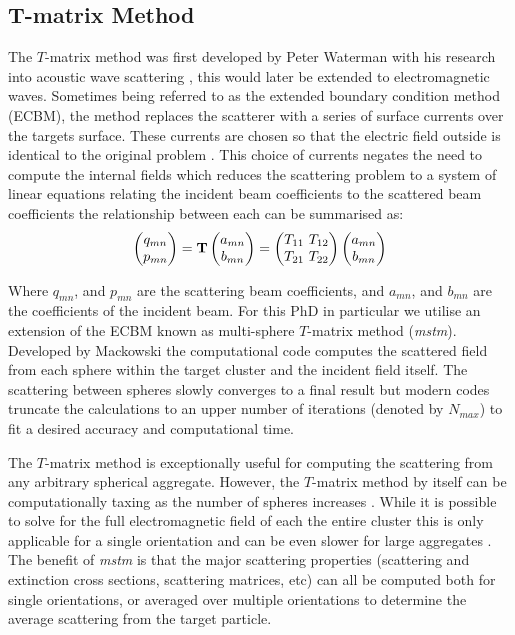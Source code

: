 \subsection{T-matrix Method}
The $T$-matrix method was first developed by Peter Waterman with his
research into acoustic wave scattering \cite{Waterman1969}, this 
would later be extended to electromagnetic waves. Sometimes being 
referred to as the extended boundary condition method (ECBM), 
the method replaces the scatterer with a series of surface currents
over the targets surface. These currents are chosen so that the
electric field outside is identical to the original problem \cite{Wriedt1998}. 
This choice of currents negates the need to compute the internal fields
which reduces the scattering problem to a system of linear equations 
relating the incident beam coefficients to the scattered beam coefficients
the relationship between each can be summarised as:
\begin{align}
	\label{eq:t_matrix}
	\begin{pmatrix}
		q_{mn} \\
		p_{mn} 
	\end{pmatrix}
	= \bold{T} 
	\begin{pmatrix}
		a_{mn} \\
		b_{mn}
	\end{pmatrix}
	= \begin{pmatrix}
		T_{11} \ T_{12} \\
		T_{21} \ T_{22}
	\end{pmatrix}
	\begin{pmatrix}
		a_{mn} \\
		b_{mn}
	\end{pmatrix}
\end{align}

Where $q_{mn}$, and $p_{mn}$ are the scattering beam coefficients, and
$a_{mn}$, and $b_{mn}$ are the coefficients of the incident beam. For 
this PhD in particular we utilise an extension of the ECBM known as 
multi-sphere $T$-matrix method (\textit{mstm}). Developed by Mackowski
\cite{Mackowski2011} the computational code computes the scattered field 
from each sphere within the target cluster and the incident field itself. 
The scattering between spheres slowly converges to a final result but modern 
codes truncate the calculations to an upper number of iterations (denoted by
$N_{max}$) to fit a desired accuracy and computational time. 

The $T$-matrix method is exceptionally useful for computing the scattering 
from any arbitrary spherical aggregate. However, the $T$-matrix method by 
itself can be computationally taxing as the number of spheres increases 
\cite{Mackowski2011}. While it is possible to solve for the full electromagnetic 
field of each the entire cluster this is only applicable for a single 
orientation and can be even slower for large aggregates \cite{Mackowski1996, 
Xu1995}. The benefit of \textit{mstm} is that the major scattering properties 
(scattering and extinction cross sections, scattering matrices, etc) can 
all be computed both for single orientations, or averaged over multiple 
orientations to determine the average scattering from the target particle. 

